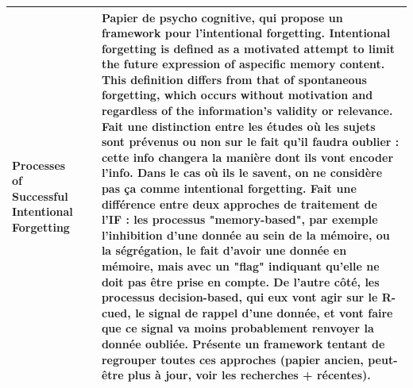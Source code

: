 \documentclass[french]{article}
\begin{document}
\begin{table}[ht!]
\begin{center}
\begin{tabular}{|p{}|p{}|p{}|}
            Processes of Successful Intentional Forgetting \cite{johnson_processes_1994}
            & 
            & Papier de psycho cognitive, qui propose un framework pour l'intentional forgetting. Intentional forgetting is defined as a motivated attempt to limit the future expression of aspecific memory content. This definition differs from that of spontaneous forgetting, which occurs without motivation and regardless of the information's validity or relevance.
            Fait une distinction entre les études où les sujets sont prévenus ou non sur le fait qu'il faudra oublier : cette info changera la manière dont ils vont encoder l'info. Dans le cas où ils le savent, on ne considère pas ça comme intentional forgetting.
            Fait une différence entre deux approches de traitement de l'IF : les processus "memory-based", par exemple l'inhibition d'une donnée au sein de la mémoire, ou la ségrégation, le fait d'avoir une donnée en mémoire, mais avec un "flag" indiquant qu'elle ne doit pas être prise en compte. De l'autre côté, les processus decision-based, qui eux vont agir sur le R-cued, le signal de rappel d'une donnée, et vont faire que ce signal va moins probablement renvoyer la donnée oubliée. Présente un framework tentant de regrouper toutes ces approches (papier ancien, peut-être plus à jour, voir les recherches + récentes).

            \\
            \hline


\end{tabular}
\end{center}
\end{table}
\end{document}
